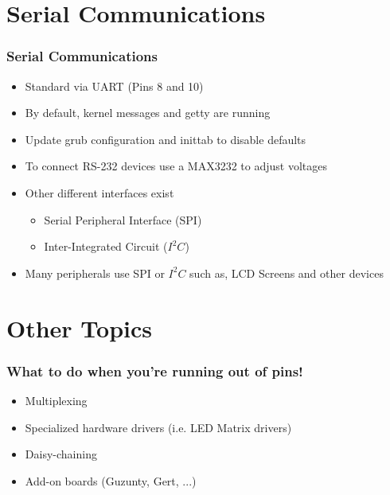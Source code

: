 \documentclass[slidestop,usepdftitle=false,14pt,table]{beamer}
\begin{document}
\section{Serial Communications}
\begin{frame}[allowframebreaks]
  \frametitle{Serial Communications}
  \begin{itemize}
  \item Standard via UART (Pins 8 and 10)
  \item By default, kernel messages and getty are running
  \item Update grub configuration and inittab to disable defaults
  \item To connect RS-232 devices use a MAX3232 to adjust voltages
  \item Other different interfaces exist
    \begin{itemize}
    \item Serial Peripheral Interface (SPI)
    \item Inter-Integrated Circuit ($I^2C$)
    \end{itemize}
  \item Many peripherals use SPI or $I^2C$ such as, LCD Screens and other devices
  \end{itemize}
\end{frame}


\section{Other Topics}
\begin{frame}
  \frametitle{What to do when you're running out of pins!}
  \begin{itemize}
  \item Multiplexing
  \item Specialized hardware drivers (i.e. LED Matrix drivers)
  \item Daisy-chaining 
  \item Add-on boards (Guzunty, Gert, ...)
  \end{itemize}
\end{frame}
  
\end{document}
